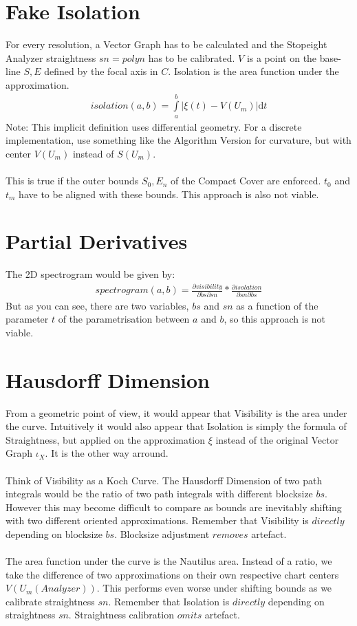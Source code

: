 \documentclass{report}
\begin{document}
\section{Fake Isolation}
For every resolution, a Vector Graph has to be calculated and the Stopeight Analyzer straightness $sn=polyn$ has to be calibrated. $V$ is a point on the base-line $S,E$ defined by the focal axis in $C$.
Isolation is the area function under the approximation.
\begin{align}
isolation(a,b)= \int \limits _{a}^{b} \vert \xi(t)-V(U_{m})\vert  \mathrm{d}t
\end{align}
Note: This implicit definition uses differential geometry. For a discrete implementation, use something like the Algorithm Version for curvature, but with center $V(U_{m})$ instead of $S(U_{m})$.\\\\
This is true if the outer bounds $S_{0},E_{n}$ of the Compact Cover are enforced. $t_{0}$ and $t_{m}$ have to be aligned with these bounds.
This approach is also not viable.

\section{Partial Derivatives}
The 2D spectrogram would be given by:
\begin{align}
spectrogram(a,b)=\frac{\partial visibility}{\partial bs \partial sn}*\frac{\partial isolation}{\partial sn \partial bs}
\end{align}
But as you can see, there are two variables, $bs$ and $sn$ as a function of the parameter $t$ of the parametrisation between $a$ and $b$, so this approach is not viable.

\section{Hausdorff Dimension}

From a geometric point of view, it would appear that Visibility is the area under the curve. Intuitively it would also appear that Isolation is simply the formula of Straightness, but applied on the approximation $\xi$ instead of the original Vector Graph $\iota_{X}$. It is the other way arround.\\\\
Think of Visibility as a Koch Curve. The Hausdorff Dimension of two path integrals would be the ratio of two path integrals with different blocksize $bs$. However this may become difficult to compare as bounds are inevitably shifting with two different oriented approximations. Remember that Visibility is $directly$ depending on blocksize $bs$. Blocksize adjustment $removes$ artefact.\\\\
The area function under the curve is the Nautilus area. Instead of a ratio, we take the difference of two approximations on their own respective chart centers $V(U_{m}(Analyzer))$. This performs even worse under shifting bounds as we calibrate straightness $sn$. Remember that Isolation is $directly$ depending on straightness $sn$. Straightness calibration $omits$ artefact.
\end{document}
